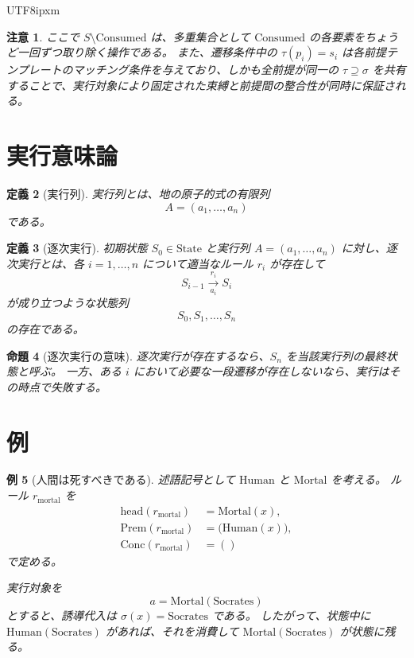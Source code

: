 \documentclass[a4paper,11pt]{bxjsarticle}
\newcommand{\JPCJKfamily}{ipxm}
\newtheorem{definition}{定義}[section]
\newtheorem{proposition}[definition]{命題}
\newtheorem{remark}[definition]{注意}
\newtheorem{example}[definition]{例}
\newcommand{\State}{\mathrm{State}}
\newcommand{\headsym}{\mathrm{head}}
\newcommand{\Prem}{\mathrm{Prem}}
\newcommand{\Conc}{\mathrm{Conc}}
\newcommand{\Consumed}{\mathrm{Consumed}}
\begin{document}
\begin{CJK}{UTF8}{\JPCJKfamily}
\begin{remark}
ここで $S \setminus \Consumed$ は、多重集合として $\Consumed$ の各要素をちょうど一回ずつ取り除く操作である。
また、遷移条件中の $\tau(p_i)=s_i$ は各前提テンプレートのマッチング条件を与えており、しかも全前提が同一の $\tau \supseteq \sigma$ を共有することで、実行対象により固定された束縛と前提間の整合性が同時に保証される。
\end{remark}

\section{実行意味論}

\begin{definition}[実行列]
実行列とは、地の原子的式の有限列
\[
A=(a_1,\dots,a_n)
\]
である。
\end{definition}

\begin{definition}[逐次実行]
初期状態 $S_0 \in \State$ と実行列 $A=(a_1,\dots,a_n)$ に対し、逐次実行とは、各 $i=1,\dots,n$ について適当なルール $r_i$ が存在して
\[
S_{i-1} \xrightarrow[a_i]{r_i} S_i
\]
が成り立つような状態列
\[
S_0,S_1,\dots,S_n
\]
の存在である。
\end{definition}

\begin{proposition}[逐次実行の意味]
逐次実行が存在するなら、$S_n$ を当該実行列の最終状態と呼ぶ。
一方、ある $i$ において必要な一段遷移が存在しないなら、実行はその時点で失敗する。
\end{proposition}

\section{例}

\begin{example}[人間は死すべきである]
述語記号として $\mathrm{Human}$ と $\mathrm{Mortal}$ を考える。
ルール $r_{\mathrm{mortal}}$ を
\begin{align*}
\headsym(r_{\mathrm{mortal}}) &= \mathrm{Mortal}(x), \\
\Prem(r_{\mathrm{mortal}}) &= \bigl(\mathrm{Human}(x)\bigr), \\
\Conc(r_{\mathrm{mortal}}) &= ()
\end{align*}
で定める。

実行対象を
\[
a = \mathrm{Mortal}(\mathrm{Socrates})
\]
とすると、誘導代入は $\sigma(x)=\mathrm{Socrates}$ である。
したがって、状態中に $\mathrm{Human}(\mathrm{Socrates})$ があれば、それを消費して $\mathrm{Mortal}(\mathrm{Socrates})$ が状態に残る。
\end{example}


\end{CJK}
\end{document}
